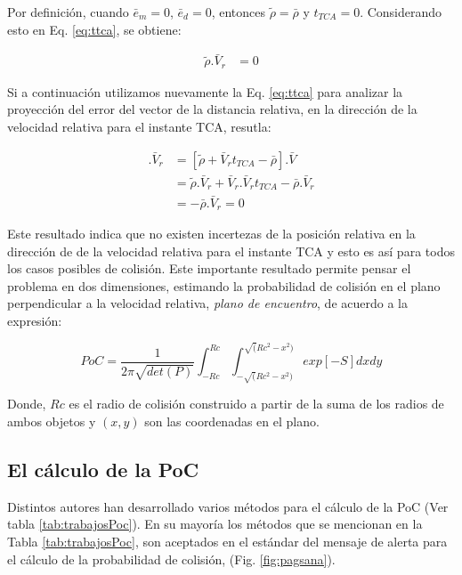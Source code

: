 Por definici\'on, cuando $\bar{e}_m=0$, $\bar{e}_d=0$, entonces $\tilde{\rho}=\bar{\rho}$ y $t_{TCA}=0$. Considerando esto en Eq. \ref{eq:ttca}, se obtiene:


\begin{align*}
  \tilde{\rho}.\bar{V}_r &= 0
\end{align*}

Si a continuaci\'on utilizamos nuevamente la Eq. \ref{eq:ttca} para analizar la proyecci\'on del error del vector de la distancia relativa, en la direcci\'on de la velocidad relativa para el instante TCA, resutla:

\begin{align*}
  [\tilde{\rho}(t_{TCA})-\bar{\rho}].\bar{V}_r &= [\tilde{\rho}+\bar{V}_rt_{TCA}-\bar{\rho}].\bar{V}\\
  &=\tilde{\rho}.\bar{V}_r +\bar{V}_r .\bar{V}_r t_{TCA}-\bar{\rho}.\bar{V}_r\\
  &=-\bar{\rho}.\bar{V}_r=0
\end{align*}

Este resultado indica que no existen incertezas de la posici\'on relativa en la direcci\'on de de la velocidad relativa para el instante TCA y esto es as\'i para todos los casos posibles de colisi\'on. Este importante resultado permite pensar el problema en dos dimensiones, estimando la probabilidad de colisi\'on en el plano perpendicular a la velocidad relativa, {\it{plano de encuentro}}, de acuerdo a la expresi\'on: 

\begin{equation}
 PoC=\frac{1}{2 \pi \sqrt{det(P)}}\int_{-Rc}^{Rc}\int_{-\sqrt(Rc^{2}-x^{2})}^{\sqrt(Rc^{2}-x^{2})}exp [-S] dxdy
 \label{eq:pocintegralarea}
\end{equation}

Donde, $Rc$ es el radio de colisi\'on construido a partir de la suma de los radios de ambos objetos y $(x,y)$ son las coordenadas en el plano. 


\subsection{El c\'alculo de la PoC}\label{sec:calculoPoC}

Distintos autores han desarrollado varios m\'etodos para el c\'alculo de la PoC (Ver tabla \ref{tab:trabajosPoc}). En su mayor\'ia los m\'etodos que se mencionan en la Tabla \ref{tab:trabajosPoc}, son aceptados en el est\'andar del mensaje de alerta para el c\'alculo de la probabilidad de colisi\'on, (Fig. \ref{fig:pagsana}).

